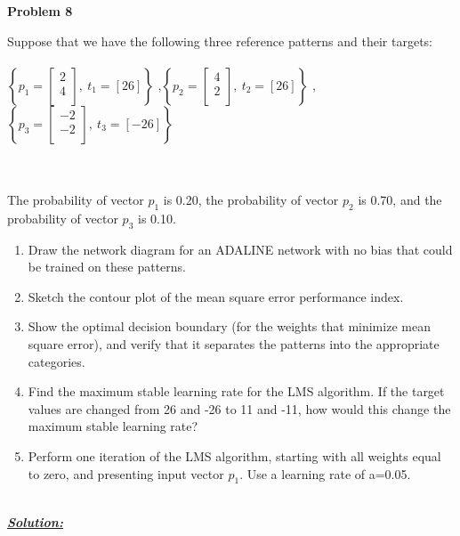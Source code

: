 \documentclass{article}
\begin{document}
\newpage
\noindent \textbf{Problem 8}

\noindent Suppose that we have the following three reference patterns and their targets: \\ \\
\noindent $\left\{ p_1 = \begin{bmatrix}
  2 \\
  4 \\
\end{bmatrix}, \ t_1 = [26] \right\}$
\noindent ,$\left\{ p_2 = \begin{bmatrix}
  4 \\
  2 \\
\end{bmatrix}, \ t_2 = [26] \right\}$
\noindent ,$\left\{ p_3 = \begin{bmatrix}
  -2 \\
  -2 \\
\end{bmatrix}, \ t_3 = [-26] \right\}$

\noindent \\ \\ The probability of vector $p_1$ is 0.20, the probability of vector $p_2$ is 0.70, and the probability of vector $p_3$ is 0.10.
\begin{enumerate}[label=\Alph*]
  \item  Draw the network diagram for an ADALINE network with no bias that could be 
  trained on these patterns.
  \item Sketch the contour plot of the mean square error performance index.
  \item Show the optimal decision boundary (for the weights that minimize mean square error), and verify that it separates the patterns into the appropriate categories.
  \item Find the maximum stable learning rate for the LMS algorithm. If the target values are changed from 26 and -26 to 11 and -11, how would this change the maximum 
  stable learning rate?
  \item Perform one iteration of the LMS algorithm, starting with all weights equal to zero, 
  and presenting input vector $p_1$. Use a learning rate of a=0.05. \\ \\
\end{enumerate}

\noindent \underline{\textbf{\textit{Solution:}}}
\end{document}
